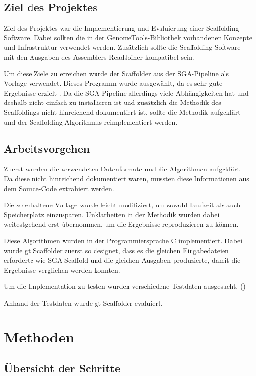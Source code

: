\documentclass[a4paper,10pt,parskip]{scrartcl}
\begin{document}
\subsection{Ziel des Projektes}
Ziel des Projektes war die Implementierung und Evaluierung einer
Scaffolding-Software. Dabei sollten die in der GenomeTools-Bibliothek
\cite{Gremme:2013} vorhandenen Konzepte und Infrastruktur verwendet
werden. Zusätzlich sollte die Scaffolding-Software mit den Ausgaben
des Assemblers ReadJoiner kompatibel sein.

Um diese Ziele zu erreichen wurde der Scaffolder aus der SGA-Pipeline
\cite{Simpson:2012ef} als Vorlage verwendet. Dieses Programm wurde
ausgewählt, da es sehr gute Ergebnisse erzielt \cite{Hunt:2014dh}. Da
die SGA-Pipeline allerdings viele Abhängigkeiten hat und deshalb nicht
einfach zu installieren ist und zusätzlich die Methodik des
Scaffoldings nicht hinreichend dokumentiert ist, sollte die Methodik
aufgeklärt und der Scaffolding-Algorithmus reimplementiert werden.

\subsection{Arbeitsvorgehen}
Zuerst wurden die verwendeten Datenformate und die Algorithmen
aufgeklärt. Da diese nicht hinreichend dokumentiert waren, mussten
diese Informationen aus dem Source-Code extrahiert werden.

Die so erhaltene Vorlage wurde leicht modifiziert, um sowohl Laufzeit
als auch Speicherplatz einzusparen. Unklarheiten in der Methodik wurden
dabei weitestgehend erst übernommen, um die Ergebnisse reproduzieren
zu können.

Diese Algorithmen wurden in der Programmiersprache C
implementiert. Dabei wurde gt Scaffolder zuerst so designet, dass es
die gleichen Eingabedateien erforderte wie SGA-Scaffold und die
gleichen Ausgaben produzierte, damit die Ergebnisse verglichen werden
konnten.

Um die Implementation zu testen wurden verschiedene Testdaten
ausgesucht. ()

Anhand der Testdaten wurde gt Scaffolder evaluiert.

\section{Methoden}
\label{sec: Methoden}
\subsection{Übersicht der Schritte}
\end{document}

